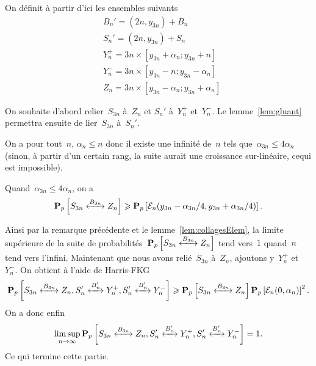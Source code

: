 		On définit à partir d'ici les ensembles suivants
		\begin{align*}
			&B_n' = (2n, y_{3n}) + B_n \\
			&S_n' = (2n, y_{3n}) + S_n \\
			&Y_n^+ = {3n} \times [y_{3n} + \alpha_n; y_{3n} + n] \\
			&Y_n^- = {3n} \times [y_{3n} - n; y_{3n} - \alpha_n] \\
			&Z_n = {3n} \times [y_{3n} - \alpha_n; y_{3n} + \alpha_n]
		\end{align*}
		

		On souhaite d'abord relier~$S_{3n}$ à~$Z_n$ et $S_n'$ à~$Y_n^+$ et~$Y_n^-$. Le lemme~\ref{lem:gluant} permettra ensuite de lier~$S_{3n}$ à~$S_n'$.

		On a pour tout~$n$, $\alpha_n \leq n$ donc il existe une infinité de~$n$ tels que~$\alpha_{3n} \leq 4\alpha_n$ (sinon, à partir d'un certain rang, la suite aurait une croissance sur-linéaire, cequi est impossible). 
		
		Quand~$\alpha_{3n} \leq 4\alpha_n$, on a
		\[
			\Pp{\relie[B_{3n}]{S_{3n}}{Z_n}} \geq \Pp{\mathcal{E}_n(y_{3n} - \alpha_{3n}/4, y_{3n} + \alpha_{3n}/4)}.
		\]

		Ainsi par la remarque précédente et le lemme~\ref{lem:collagesElem}, la limite supérieure de la suite de probabilités~$\Pp{\relie[B_{3n}]{S_{3n}}{Z_n}}$ tend vers~$1$ quand~$n$ tend vers l'infini. Maintenant que nous avons relié~$S_{3n}$ à~$Z_n$, ajoutons y~$Y_n^+$ et~$Y_n^-$. On obtient à l'aide de Harris-FKG
		\[
			\Pp{\relie[B_{3n}]{S_{3n}}{Z_n}, \relie[B_n']{S_n'}{Y_n^+}, \relie[B_n']{S_n'}{Y_n^-}} \geq \Pp{\relie[B_{3n}]{S_{3n}}{Z_n} }\Pp{\mathcal{E}_n(0, \alpha_n)}^2.
		\]
		On a donc enfin
		\[ 
			\limsup_{n \to \infty} \Pp{\relie[B_{3n}]{S_{3n}}{Z_n}, \relie[B_n']{S_n'}{Y_n^+}, \relie[B_n']{S_n'}{Y_n^-}} = 1.
		\]
		Ce qui termine cette partie.


